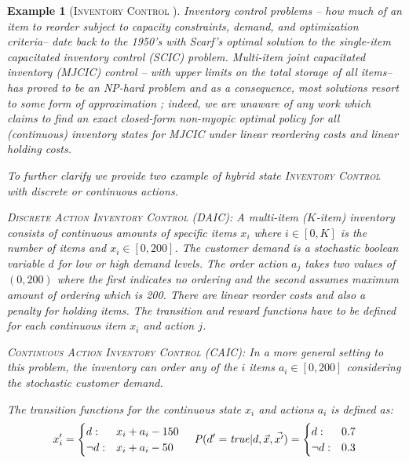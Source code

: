 \documentclass[twoside,11pt]{article}
\newcommand{\InventoryControl}{\textsc{Inventory Control }}
\newtheorem*{example*}{Example}
\begin{document}
\begin{example*} [\InventoryControl]
Inventory control problems -- how much of an
item to reorder subject to capacity constraints, demand, and optimization criteria-- date back to the 1950's with Scarf's optimal solution to the \emph{single-item capacitated inventory control} (SCIC) problem.
\emph{Multi-item joint capacitated inventory (MJCIC) control} -- with upper limits
on the total storage of all items-- has proved to be an NP-hard problem and
as a consequence, most solutions resort to some form of
approximation \cite{bitran,wusd10}; indeed, we are unaware of any 
work which claims to find an exact closed-form non-myopic
optimal policy for \emph{all} (continuous) inventory states for MJCIC 
under linear reordering costs and linear holding costs.

To further clarify we provide two example of hybrid state \InventoryControl with discrete or continuous actions.
\vspace{2mm}

\textsc{Discrete Action} \InventoryControl (\textsc{DAIC}): 
A multi-item ($K$-item) inventory consists of continuous amounts of specific items $x_i$ where $i \in [0,K]$ is the number of items and $x_i \in [0,200]$. The customer demand is a stochastic boolean variable $d$ for low or high demand levels.  The order action $a_j$ takes two values of $(0,200)$ where the first indicates no ordering and the second assumes maximum amount of ordering which is 200. There are linear reorder costs and also a penalty for holding items. The transition and reward functions have to be defined for each continuous item $x_i$ and action $j$.

\vspace{2mm}
\textsc{Continuous Action}  \InventoryControl (\textsc{CAIC}):
In a more general setting to this problem, the inventory can order  any of the $i$ items $a_i \in [0,200]$ considering the stochastic customer demand. 

The transition functions for the continuous state $x_i$ and actions $a_i$ is defined as: 
{%
\vspace{-2mm}
\begin{align}
x'_i= \begin{cases}
d  : & x_i + a_i - 150 \\
\neg d : & x_i + a_i - 50    
\end{cases} 
\hspace{4mm}
 \mathit{P}(d'=\mathit{true}|d,\vec{x},\vec{x'})=  \begin{cases}
d     :& 0.7\\
\neg d : & 0.3	\\
\end{cases} \label{eq:trans_inv}
\end{align}
\vspace{-2mm}}


\end{example*}
\end{document}
